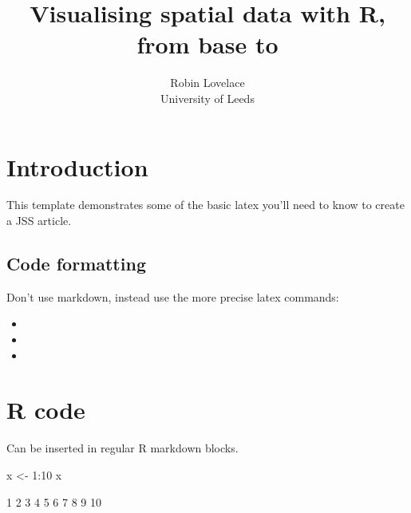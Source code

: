 \documentclass[article]{jss}
\author{
Robin Lovelace\\University of Leeds
}
\title{Visualising spatial data with R, from base to \pkg{shiny}}
\providecommand{\tightlist}{%
  \setlength{\itemsep}{0pt}\setlength{\parskip}{0pt}}
\begin{document}
\section{Introduction}\label{introduction}

This template demonstrates some of the basic latex you'll need to know
to create a JSS article.

\subsection{Code formatting}\label{code-formatting}

Don't use markdown, instead use the more precise latex commands:

\begin{itemize}
\tightlist
\item
\item
\item
\end{itemize}

\section{R code}\label{r-code}

Can be inserted in regular R markdown blocks.

\begin{CodeChunk}
\begin{CodeInput}
x <- 1:10
x
\end{CodeInput}
\begin{CodeOutput}
 [1]  1  2  3  4  5  6  7  8  9 10
\end{CodeOutput}
\end{CodeChunk}
\end{document}
